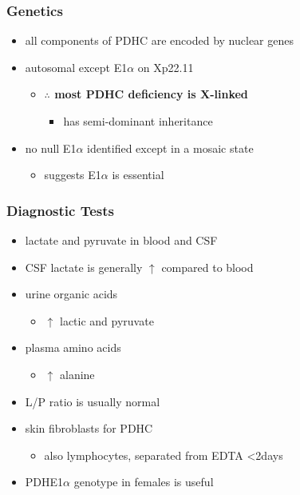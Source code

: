 \documentclass{scrartcl}
\begin{document}
\subsubsection{Genetics}
\label{sec:org92d337e}
\begin{itemize}
\item all components of PDHC are encoded by nuclear genes
\item autosomal except E1\(\alpha\) on Xp22.11
\begin{itemize}
\item \textbf{\(\therefore\) most PDHC deficiency is X-linked}
\begin{itemize}
\item has semi-dominant inheritance
\end{itemize}
\end{itemize}
\item no null E1\(\alpha\) identified except in a mosaic state
\begin{itemize}
\item suggests E1\(\alpha\) is essential
\end{itemize}
\end{itemize}

\subsubsection{Diagnostic Tests}
\label{sec:org9e4c9c0}
\begin{itemize}
\item lactate and pyruvate in blood and CSF
\item CSF lactate is generally \(\uparrow\) compared to blood
\item urine organic acids
\begin{itemize}
\item \(\uparrow\) lactic and pyruvate
\end{itemize}
\item plasma amino acids
\begin{itemize}
\item \(\uparrow\) alanine
\end{itemize}
\item L/P ratio is usually normal
\item skin fibroblasts for PDHC
\begin{itemize}
\item also lymphocytes, separated from EDTA <2days
\end{itemize}
\item PDHE1\(\alpha\) genotype in females is useful
\end{itemize}
\end{document}
